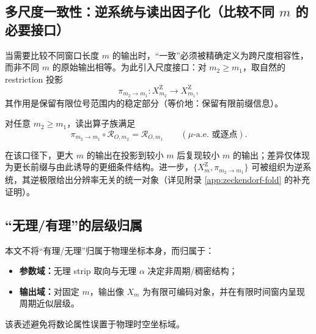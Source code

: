 \subsection{多尺度一致性：逆系统与读出因子化（比较不同 \texorpdfstring{$m$}{m} 的必要接口）}

当需要比较不同窗口长度 $m$ 的输出时，“一致”必须被精确定义为跨尺度相容性，而非不同 $m$ 的原始输出相等。为此引入尺度接口：对 $m_2\ge m_1$，取自然的 restriction 投影
\[
\pi_{m_2\to m_1}:X_{m_2}^{\mathrm Z}\to X_{m_1}^{\mathrm Z},
\]
其作用是保留有限位号范围内的稳定部分（等价地：保留有限前缀信息）。

\begin{assumption}\label{assump:ontology-scale-factorization}
对任意 $m_2\ge m_1$，读出算子族满足
\[
\pi_{m_2\to m_1}\circ \mathcal{R}_{O,m_2}=\mathcal{R}_{O,m_1}\qquad (\mu\text{-a.e. 或逐点}).
\]
\end{assumption}

在该口径下，更大 $m$ 的输出在投影到较小 $m$ 后复现较小 $m$ 的输出；差异仅体现为更长前缀与由此诱导的更细条件结构。进一步，$\{X_m^{\mathrm Z},\pi_{m_2\to m_1}\}$ 可被组织为逆系统，其逆极限给出分辨率无关的统一对象（详见附录 \ref{app:zeckendorf-fold} 的补充证明）。

\subsection{“无理/有理”的层级归属}

本文不将“有理/无理”归属于物理坐标本身，而归属于：
\begin{itemize}
  \item \textbf{参数域：}无理 strip 取向与无理 $\alpha$ 决定非周期/稠密结构；
  \item \textbf{输出域：}对固定 $m$，输出像 $X_m$ 为有限可编码对象，并在有限时间窗内呈现周期近似层级。
\end{itemize}
该表述避免将数论属性误置于物理时空坐标域。

